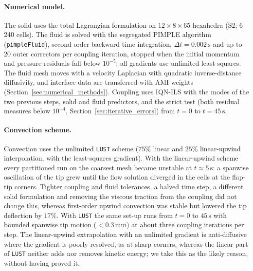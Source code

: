 \paragraph{Numerical model.}
The solid uses the total Lagrangian formulation on $12 \times 8 \times 65$ hexahedra (S2; 6\,240 cells).
The fluid is solved with the segregated PIMPLE algorithm (\texttt{pimpleFluid}), second-order backward time integration, $\Delta t = 0.002\,\mathrm{s}$ and up to 20 outer correctors per coupling iteration, stopped when the initial momentum and pressure residuals fall below $10^{-5}$; all gradients use unlimited least squares.
The fluid mesh moves with a velocity Laplacian with quadratic inverse-distance diffusivity, and interface data are transferred with AMI weights (Section~\ref{sec:numerical_methods}).
Coupling uses IQN-ILS with the modes of the two previous steps, solid and fluid predictors, and the strict test (both residual measures below $10^{-4}$, Section~\ref{sec:iterative_errors}) from $t = 0$ to $t = 45\,\mathrm{s}$.

\paragraph{Convection scheme.}
Convection uses the unlimited \texttt{LUST} scheme ($75\%$ linear and $25\%$ linear-upwind interpolation, with the least-squares gradient).
With the linear-upwind scheme every partitioned run on the coarsest mesh became unstable at $t \approx 5\,\mathrm{s}$: a spanwise oscillation of the tip grew until the flow solution diverged in the cells at the flap-tip corners. Tighter coupling and fluid tolerances, a halved time step, a different solid formulation and removing the viscous traction from the coupling did not change this, whereas first-order upwind convection was stable but lowered the tip deflection by $17\%$. With \texttt{LUST} the same set-up runs from $t = 0$ to $45\,\mathrm{s}$ with bounded spanwise tip motion ($< 0.3\,\mathrm{mm}$) at about three coupling iterations per step.
The linear-upwind extrapolation with an unlimited gradient is anti-diffusive where the gradient is poorly resolved, as at sharp corners, whereas the linear part of \texttt{LUST} neither adds nor removes kinetic energy; we take this as the likely reason, without having proved it.

